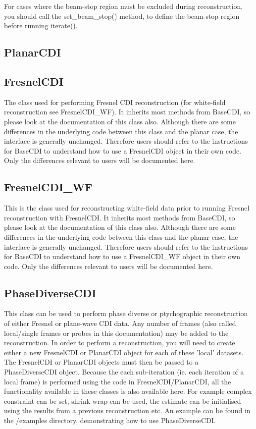 \documentclass[]{cxs-software}
\begin{document}
For cases where the beam-stop region must be excluded during
reconstruction, you should call the set\_beam\_stop() method, to define
the beam-stop region before running iterate().


\subsection{PlanarCDI}

\subsection{FresnelCDI}
The class used for performing Fresnel CDI reconstruction (for
white-field reconstruction see FresnelCDI\_WF). It inherits most
methods from BaseCDI, so please look at the documentation of this
class also. Although there are some differences in the underlying code
between this class and the planar case, the interface is generally
unchanged. Therefore users should refer to the instructions for
BaseCDI to understand how to use a FresnelCDI object in their own
code. Only the differences relevant to users will be documented here.

\subsection{FresnelCDI\_WF}
This is the class used for reconstructing white-field data prior to
running Fresnel reconstruction with FresnelCDI. It inherits most
methods from BaseCDI, so please look at the documentation of this
class also. Although there are some differences in the underlying code
between this class and the planar case, the interface is generally
unchanged. Therefore users should refer to the instructions for
BaseCDI to understand how to use a FresnelCDI\_WF object in their own
code. Only the differences relevant to users will be documented here.

\subsection{PhaseDiverseCDI}

This class can be used to perform phase diverse or ptychographic
reconstruction of either Fresnel or plane-wave CDI data. Any number of
frames (also called local/single frames or probes in this
documentation) may be added to the reconstruction. In order to perform
a reconstruction, you will need to create either a new FresnelCDI or
PlanarCDI object for each of these 'local' datasets. The FresnelCDI or
PlanarCDI objects must then be passed to a PhaseDiverseCDI
object. Because the each sub-iteration (ie. each iteration of a local
frame) is performed using the code in FresnelCDI/PlanarCDI, all the
functionality available in these classes is also available here. For
example complex constraint can be set, shrink-wrap can be used, the
estimate can be initialised using the results from a previous
reconstruction etc. An example can be found in the /examples
directory, demonstrating how to use PhaseDiverseCDI.
\end{document}

